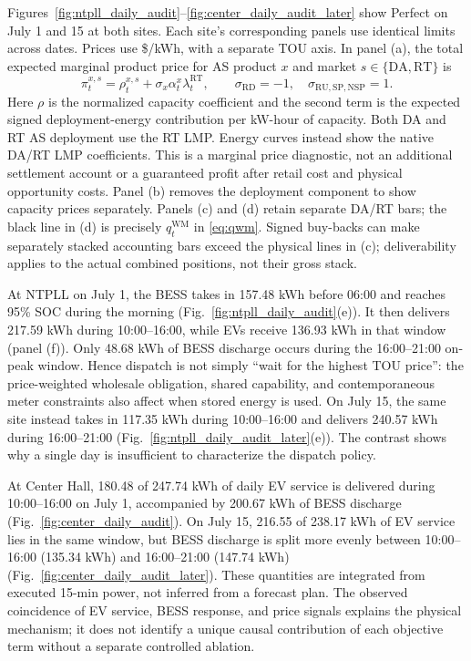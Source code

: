 \documentclass[final,5p,times]{elsarticle}
\newcommand{\DA}{\mathrm{DA}}
\newcommand{\RT}{\mathrm{RT}}
\newcommand{\RU}{\mathrm{RU}}
\newcommand{\RD}{\mathrm{RD}}
\newcommand{\SP}{\mathrm{SP}}
\newcommand{\NSP}{\mathrm{NSP}}
\newcommand{\WM}{\mathrm{WM}}
\begin{document}
Figures~\ref{fig:ntpll_daily_audit}--\ref{fig:center_daily_audit_later}
show Perfect on July 1 and 15 at both sites. Each site's corresponding panels
use identical limits across dates. Prices use \$/kWh, with a separate TOU
axis. In panel (a), the total expected marginal product price for AS product $x$ and
market $s\in\{\DA,\RT\}$ is
\begin{equation}
\pi_t^{x,s}=\rho_t^{x,s}+\sigma_x\alpha_t^x\lambda_t^{\RT},
\qquad \sigma_{\RD}=-1,\quad \sigma_{\RU,\SP,\NSP}=1.
\label{eq:expected_product_price}
\end{equation}
Here $\rho$ is the normalized capacity coefficient and the second term is the
expected signed deployment-energy contribution per kW-hour of capacity. Both
DA and RT AS deployment use the RT LMP. Energy curves instead show the native
DA/RT LMP coefficients. This is a marginal price diagnostic, not an additional
settlement account or a guaranteed profit after retail cost and physical
opportunity costs. Panel (b) removes the deployment component to show capacity
prices separately. Panels (c) and (d) retain separate DA/RT bars; the black
line in (d) is precisely $q_t^{\WM}$ in \eqref{eq:qwm}. Signed buy-backs can
make separately stacked accounting bars exceed the physical lines in (c);
deliverability applies to the actual combined positions, not their gross stack.

At NTPLL on July 1, the BESS takes in 157.48 kWh before 06:00 and reaches
95\% SOC during the morning (Fig.~\ref{fig:ntpll_daily_audit}(e)). It then
delivers 217.59 kWh during 10:00--16:00, while EVs receive 136.93 kWh in
that window (panel (f)). Only 48.68 kWh of BESS discharge occurs during the
16:00--21:00 on-peak window. Hence dispatch is not simply ``wait for the
highest TOU price'': the price-weighted wholesale obligation, shared capability,
and contemporaneous meter constraints also affect when stored energy is used.
On July 15, the same site instead takes in 117.35 kWh during 10:00--16:00
and delivers 240.57 kWh during 16:00--21:00
(Fig.~\ref{fig:ntpll_daily_audit_later}(e)). The contrast shows why a single
day is insufficient to characterize the dispatch policy.

At Center Hall, 180.48 of 247.74 kWh of daily EV service is delivered during
10:00--16:00 on July 1, accompanied by 200.67 kWh of BESS discharge
(Fig.~\ref{fig:center_daily_audit}). On July 15, 216.55 of 238.17 kWh of
EV service lies in the same window, but BESS discharge is split more evenly
between 10:00--16:00 (135.34 kWh) and 16:00--21:00 (147.74 kWh)
(Fig.~\ref{fig:center_daily_audit_later}). These quantities are integrated
from executed 15-min power, not inferred from a forecast plan. The observed
coincidence of EV service, BESS response, and price signals explains the
physical mechanism; it does not identify a unique causal contribution of each
objective term without a separate controlled ablation.
\end{document}
